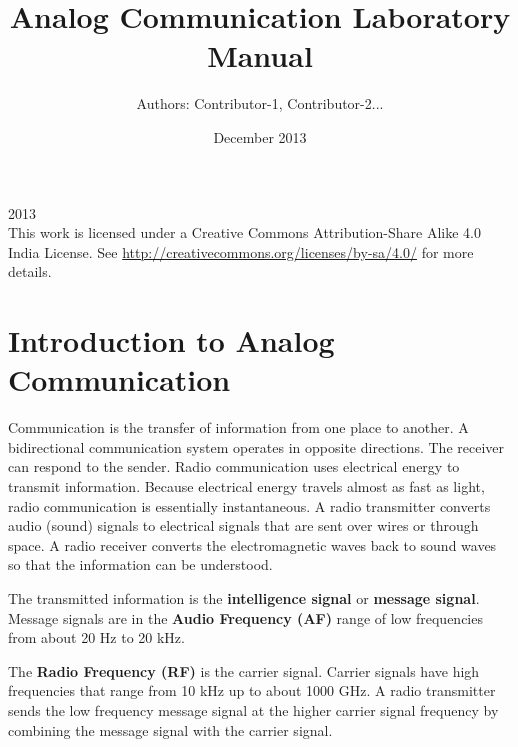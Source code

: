 \documentclass{book}
\begin{document}
\thispagestyle{empty}
\thispagestyle{empty}

\title{Analog Communication
Laboratory Manual}
\date{December 2013}
\author {Authors: Contributor-1, Contributor-2...}
\maketitle
  
\textcopyright{}2013
\\[5cm]
    This work is licensed under a Creative Commons Attribution-Share Alike 4.0 India License. See \url{http://creativecommons.org/licenses/by-sa/4.0/} for more details.






\thispagestyle{empty}
\tableofcontents
\thispagestyle{empty}
\thispagestyle{empty}

\listoffigures
\thispagestyle{empty}
\chapter [Introduction to Analog Communication]{Introduction to Analog Communication}


\cite{ACmanual}Communication is the transfer of information from one place to another. A bidirectional communication system operates in opposite directions. The receiver can respond
to the sender. Radio communication uses electrical energy to transmit information. Because electrical energy travels almost as fast as light, radio communication is essentially instantaneous.
A radio transmitter converts audio (sound) signals to electrical signals that are sent over wires or through space. A radio receiver converts the electromagnetic waves back to sound waves so that the
information can be understood. 

The transmitted information is the \textbf {intelligence signal} or \textbf{ message signal}.
 Message signals are in the \textbf {Audio Frequency (AF)} range of low frequencies from about 20 Hz to 20 kHz.
 
 
The \textbf{Radio Frequency (RF)}  is the carrier signal. Carrier signals have high frequencies that range from 10 kHz up to about 1000 GHz.
A radio transmitter sends the low frequency message signal at the higher carrier signal frequency by combining the message signal with the carrier signal.
\end{document}
